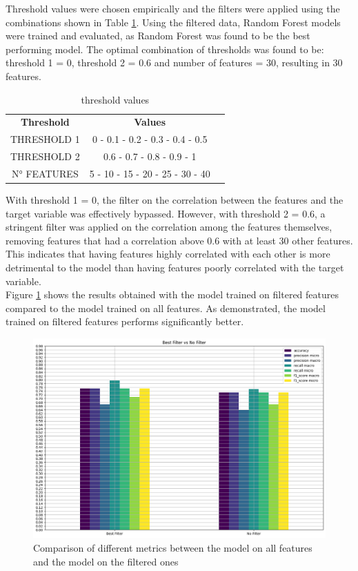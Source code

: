Threshold values were chosen empirically and the filters were applied using the combinations shown in Table \ref{tab:threshold_values}.
Using the filtered data, Random Forest models were trained and evaluated, as Random Forest was found to be the best performing model.
The optimal combination of thresholds was found to be: threshold 1 = 0, threshold 2 = 0.6 and number of features = 30, resulting in 30 features.

\begin{table}[h]
    \centering
    \small
    \begin{tabular}{|c|c|c|}
        \hline
        \textbf{Threshold} & \textbf{Values}                 \\
        THRESHOLD 1        & 0 - 0.1 - 0.2 - 0.3 - 0.4 - 0.5 \\
        THRESHOLD 2        & 0.6 - 0.7 - 0.8 - 0.9 - 1       \\
        N° FEATURES        & 5 - 10 - 15 - 20 - 25 - 30 - 40 \\
        \hline
    \end{tabular}
    \caption{threshold values}
    \label{tab:threshold_values}
\end{table}
\noindent
With threshold 1 = 0, the filter on the correlation between the features and the target variable was effectively bypassed.
However, with threshold 2 = 0.6, a stringent filter was applied on the correlation among the features themselves,
removing features that had a correlation above 0.6 with at least 30 other features. This indicates that having features
highly correlated with each other is more detrimental to the model than having features poorly correlated with the target variable.\\
Figure \ref{fig:comparison_model_on_all_features_vs_model_on_best} shows the results obtained with the model trained on filtered features
compared to the model trained on all features. As demonstrated, the model trained on filtered features performs significantly better.

\begin{figure}[H]
    \centering
    \includegraphics[width=0.9\columnwidth]{../images/model_on_all_features_vs_model_on_best.png}
    \caption{Comparison of different metrics between the model on all features and the model on the filtered ones}
    \label{fig:comparison_model_on_all_features_vs_model_on_best}
\end{figure}

